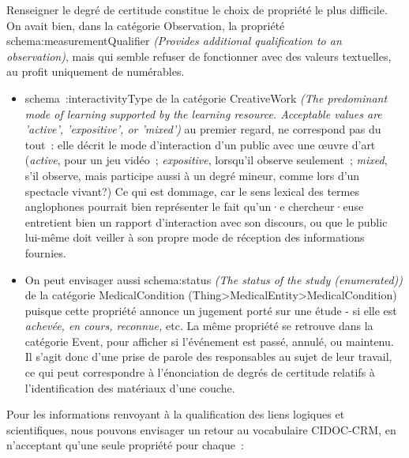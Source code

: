 \documentclass[a4paper,12pt, twoside]{book}
\begin{document}
Renseigner le degré de certitude constitue le choix de propriété le plus difficile. On avait bien, dans la catégorie \textsf{Observation}, la propriété \textsf{schema:measurementQualifier} \textit{(Provides additional qualification to an observation)}, mais qui semble refuser de fonctionner avec des valeurs textuelles, au profit uniquement de numérables.

\begin{itemize}
    \item \textsf{schema~:interactivityType} de la catégorie \textsf{CreativeWork} \textit{(The predominant mode of learning supported by the learning resource. Acceptable values are 'active', 'expositive', or 'mixed')} au premier regard, ne correspond pas du tout~: elle décrit le mode d’interaction d’un public avec une œuvre d’art (\textit{active}, pour un jeu vidéo~; \textit{expositive}, lorsqu’il observe seulement~; \textit{mixed}, s’il observe, mais participe aussi à un degré mineur, comme lors d’un spectacle vivant?) Ce qui est dommage, car le sens lexical des termes anglophones pourrait bien représenter le fait qu’un·e chercheur·euse entretient bien un rapport d’interaction avec son discours, ou que le public lui-même doit veiller à son propre mode de réception des informations fournies.\\

    \item On peut envisager aussi \textsf{schema:status} \textit{(The status of the study (enumerated))} de la catégorie \textsf{MedicalCondition (Thing>MedicalEntity>MedicalCondition)} puisque cette propriété annonce un jugement porté sur une étude - si elle est \textit{achevée, en cours, reconnue,} etc. La même propriété se retrouve dans la catégorie \textsf{Event}, pour afficher si l’événement est passé, annulé, ou maintenu. Il s’agit donc d’une prise de parole des responsables au sujet de leur travail, ce qui peut correspondre à l’énonciation de degrés de certitude relatifs à l’identification des matériaux d’une couche.
\end{itemize}

Pour les informations renvoyant à la qualification des liens logiques et scientifiques, nous pouvons envisager un retour au vocabulaire CIDOC-CRM, en n’acceptant qu’une seule propriété pour chaque~:
\end{document}

